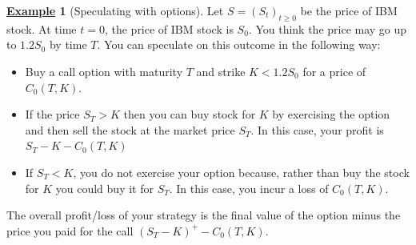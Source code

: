 \documentclass[12pt]{book}
\numberwithin{equation}{chapter}
\theoremstyle{plain}
\numberwithin{theorem}{section}
\theoremstyle{definition}
\newtheorem{example}[theorem]{\underline{Example}}
\numberwithin{exercise}{chapter}
\newcommand{\<}{\langle}
\renewcommand{\>}{\rangle}
\renewcommand{\(}{\left(}
\renewcommand{\)}{\right)}
\renewcommand{\[}{\left[}
\renewcommand{\]}{\right]}
\theoremstyle{definition}
\numberwithin{question}{section}
\begin{document}
\begin{example}[Speculating with options]
Let $S = (S_t)_{t \geq 0}$ be the price of IBM stock.
At time $t=0$, the price of IBM stock is $S_0$. You think the price may go up to $1.2 S_0$ by time $T$. You can speculate on this outcome in the following way:
\begin{itemize}
\item Buy a call option with maturity $T$ and strike $K < 1.2 S_0$ for a price of $C_0(T,K)$.
\item If the price $S_T > K$ then you can buy stock for $K$ by exercising the option and then sell the stock at the market price $S_T$.  In this case, your profit is $S_T - K - C_0(T,K)$
\item If $S_T < K$, you do not exercise your option because, rather than buy the stock for $K$ you could buy it for $S_T$.  In this case, you incur a loss of $C_0(T,K)$.
\end{itemize}
The overall profit/loss of your strategy is the final value of the option minus the price you paid for the call $(S_T - K)^+ - C_0(T,K)$.
\end{example}
\end{document}

